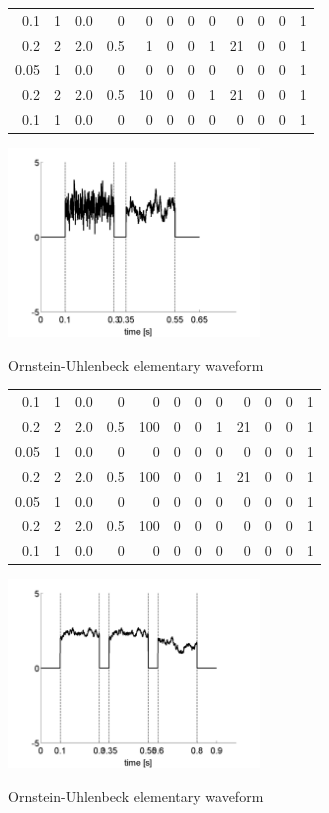 \begin{example}
\begin{center}
\footnotesize\ttfamily
\begin{tabular}{rrrrrrrrrrrr}

0.1 & 1 & 0.0 & 0 & 0 & 0 & 0 & 0 & 0 & 0 & 0 & 1 \\
0.2 & 2 & 2.0 & 0.5 & 1 & 0 & 0 & 1 & 21 & 0 & 0 & 1 \\
0.05 & 1 & 0.0 & 0 & 0 & 0 & 0 & 0 & 0 & 0 & 0 & 1 \\
0.2 & 2 & 2.0 & 0.5 & 10 & 0 & 0 & 1 & 21 & 0 & 0 & 1 \\
0.1 & 1 & 0.0 & 0 & 0 & 0 & 0 & 0 & 0 & 0 & 0 & 1 \\
\end{tabular}
\includegraphics[width=0.5\textwidth]{stimgen/Documentation2009-img004.png}
\end{center}
\caption{Ornstein-Uhlenbeck elementary waveform}
\end{example}

\begin{example}
\begin{center}
\footnotesize\ttfamily
\begin{tabular}{rrrrrrrrrrrr}
0.1 & 1 & 0.0 & 0 & 0 & 0 & 0 & 0 & 0 & 0 & 0 & 1 \\
0.2 & 2 & 2.0 & 0.5 & 100 & 0 & 0 & 1 & 21 & 0 & 0 & 1 \\
0.05 & 1 & 0.0 & 0 & 0 & 0 & 0 & 0 & 0 & 0 & 0 & 1 \\
0.2 & 2 & 2.0 & 0.5 & 100 & 0 & 0 & 1 & 21 & 0 & 0 & 1 \\
0.05 & 1 & 0.0 & 0 & 0 & 0 & 0 & 0 & 0 & 0 & 0 & 1 \\
0.2 & 2 & 2.0 & 0.5 & 100 & 0 & 0 & 0 & 0 & 0 & 0 & 1 \\
0.1 & 1 & 0.0 & 0 & 0 & 0& 0 & 0 & 0 & 0 & 0 & 1 \\
\end{tabular}
\includegraphics[width=0.5\textwidth]{stimgen/Documentation2009-img005.png}
\end{center}
\caption{Ornstein-Uhlenbeck elementary waveform}
\end{example}

